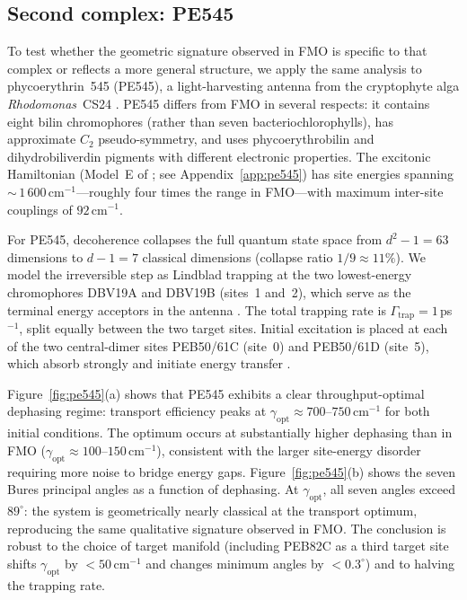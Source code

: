\documentclass[12pt,a4paper]{article}
\theoremstyle{definition}
\theoremstyle{remark}
\begin{document}
\subsection{Second complex: PE545}
\label{sec:pe545}

To test whether the geometric signature observed in FMO is specific to that complex or reflects a more general structure, we apply the same analysis to phycoerythrin~545 (PE545), a light-harvesting antenna from the cryptophyte alga \textit{Rhodomonas}~CS24 \cite{doust2004developing}. PE545 differs from FMO in several respects: it contains eight bilin chromophores (rather than seven bacteriochlorophylls), has approximate $C_2$ pseudo-symmetry, and uses phycoerythrobilin and dihydrobiliverdin pigments with different electronic properties. The excitonic Hamiltonian (Model~E of \cite{novoderezhkin2010excitation}; see Appendix~\ref{app:pe545}) has site energies spanning ${\sim}\,1\,600$\,cm$^{-1}$---roughly four times the range in FMO---with maximum inter-site couplings of $92$\,cm$^{-1}$.

For PE545, decoherence collapses the full quantum state space from $d^2 - 1 = 63$ dimensions to $d - 1 = 7$ classical dimensions (collapse ratio $1/9 \approx 11\%$). We model the irreversible step as Lindblad trapping at the two lowest-energy chromophores DBV19A and DBV19B (sites~1 and~2), which serve as the terminal energy acceptors in the antenna \cite{novoderezhkin2010excitation,doust2004developing}. The total trapping rate is $\Gamma_{\mathrm{trap}} = 1$\,ps$^{-1}$, split equally between the two target sites. Initial excitation is placed at each of the two central-dimer sites PEB50/61C (site~0) and PEB50/61D (site~5), which absorb strongly and initiate energy transfer \cite{collini2010coherently}.

Figure~\ref{fig:pe545}(a) shows that PE545 exhibits a clear throughput-optimal dephasing regime: transport efficiency peaks at $\gamma_{\mathrm{opt}} \approx 700$--$750$\,cm$^{-1}$ for both initial conditions. The optimum occurs at substantially higher dephasing than in FMO ($\gamma_{\mathrm{opt}} \approx 100$--$150$\,cm$^{-1}$), consistent with the larger site-energy disorder requiring more noise to bridge energy gaps. Figure~\ref{fig:pe545}(b) shows the seven Bures principal angles as a function of dephasing. At $\gamma_{\mathrm{opt}}$, all seven angles exceed $89^\circ$: the system is geometrically nearly classical at the transport optimum, reproducing the same qualitative signature observed in FMO. The conclusion is robust to the choice of target manifold (including PEB82C as a third target site shifts $\gamma_{\mathrm{opt}}$ by $< 50$\,cm$^{-1}$ and changes minimum angles by $< 0.3^\circ$) and to halving the trapping rate.
\end{document}
